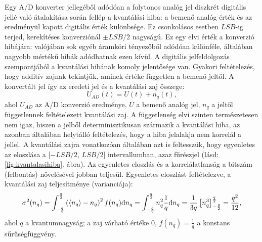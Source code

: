 \documentclass[12pt]{article}
\theoremstyle{plain}
\newcommand{\dd}{\textrm{d}}
\begin{document}
Egy A/D konverter jellegéből adódóan a folytonos analóg jel diszkrét digitális jellé való átalakítása során fellép a kvantálási hiba: a bemenő analóg érték és az eredményül kapott digitális érték különbsége. Ez csonkolásos esetben $LSB$-ig terjed, kerekítéses konverziónál $\pm LSB/2$ nagyságú. Ez egy elvi érték a konverzió hibájára: valójában sok egyéb áramköri tényezőből adódóan különféle, általában nagyobb mértékű hibák adódhatnak ezen kívül. A digitális jelfeldolgozás szempontjából a kvantálási hibának komoly jelentősége van. Gyakori feltételezés, hogy additív zajnak tekintjük, aminek értéke független a bemenő jeltől. A konvertált jel így az eredeti jel és a kvantálási zaj összege:
\begin{equation}
	U_{AD} (t) = U(t) + n_q (t),
	\label{eq:kvant_zaj}
\end{equation}
ahol $U_{AD}$ az A/D konverzió eredménye, $U$ a bemenő analóg jel, $n_q$ a jeltől függetlennek feltételezett kvantálási zaj. A függetlenség elvi szinten természetesen nem igaz, hiszen a jelből determinisztikusan származik a kvantálási hiba, az azonban általában helytálló feltételezés, hogy a hiba jelalakja nem korrelál a jellel. A kvantálási zajra vonatkozóan általában azt is feltesszük, hogy egyenletes az eloszlása a [$-LSB/2$, $LSB/2$] intervallumban, azaz fűrészjel (lásd: \ref{fig:kvantalasihiba}. ábra). Az egyenletes eloszlás és a korrelálatlanság a bitszám (felbontás) növelésével jobban teljesül. Egyenletes eloszlást feltételezve, a kvantálási zaj teljesítménye (varianciája):
\begin{equation}
	\sigma^2 (n_q) = \int_{-\frac{q}{2}}^{\frac{q}{2}} \left( \braket{n_q} - n_q \right)^2 f(n_q) \dd n_q = 
	\int_{-\frac{q}{2}}^{\frac{q}{2}} n_q^2 \frac{1}{q} \dd n_q = 
	\frac{1}{3q} \left[ n_q^3 \right]_{-\frac{q}{2}}^{\frac{q}{2}} = \frac{q^2}{12},
	\label{eq:zaj_power}
\end{equation}
ahol $q$ a kvantumnagyság; a zaj várható értéke 0, $f(n_q) = \frac{1}{q}$ a konstans sűrűségfüggvény. 
\end{document}
